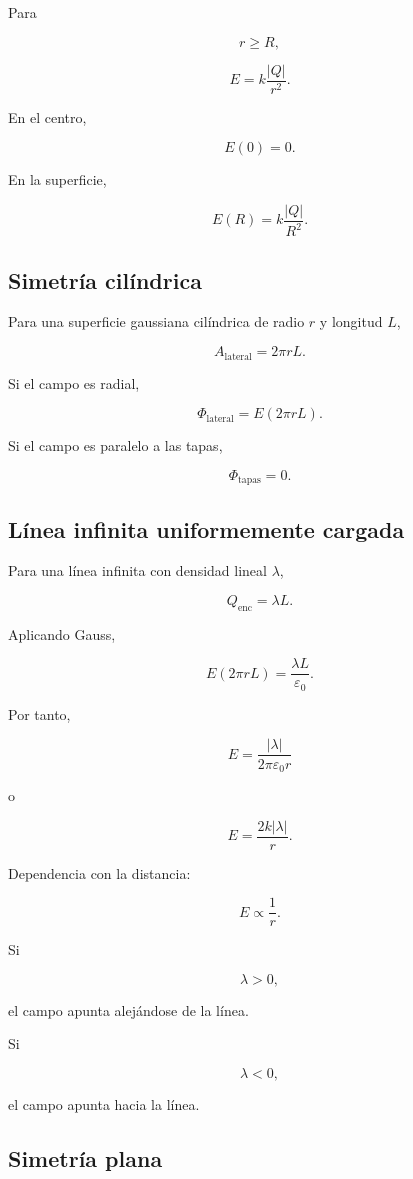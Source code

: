 Para

\[
r\geq R,
\]

\[
\boxed{
E=k\frac{|Q|}{r^2}
}.
\]

En el centro,

\[
\boxed{E(0)=0}.
\]

En la superficie,

\[
\boxed{
E(R)=k\frac{|Q|}{R^2}
}.
\]


\subsection{Simetría cilíndrica}

Para una superficie gaussiana cilíndrica de radio \(r\) y longitud \(L\),

\[
\boxed{
A_{\text{lateral}}=2\pi rL
}.
\]

Si el campo es radial,

\[
\boxed{
\Phi_{\text{lateral}}=E(2\pi rL)
}.
\]

Si el campo es paralelo a las tapas,

\[
\boxed{
\Phi_{\text{tapas}}=0
}.
\]


\subsection{Línea infinita uniformemente cargada}

Para una línea infinita con densidad lineal \(\lambda\),

\[
\boxed{
Q_{\text{enc}}=\lambda L
}.
\]

Aplicando Gauss,

\[
E(2\pi rL)
=
\frac{\lambda L}{\varepsilon_0}.
\]

Por tanto,

\[
\boxed{
E=\frac{|\lambda|}{2\pi\varepsilon_0r}
}
\]

o

\[
\boxed{
E=\frac{2k|\lambda|}{r}
}.
\]

Dependencia con la distancia:

\[
\boxed{
E\propto\frac{1}{r}
}.
\]

Si

\[
\lambda>0,
\]

el campo apunta alejándose de la línea.

Si

\[
\lambda<0,
\]

el campo apunta hacia la línea.


\subsection{Simetría plana}


